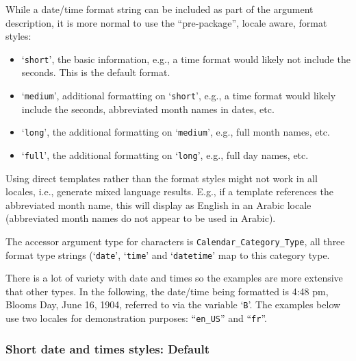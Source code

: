 While a date/time format string can be included as part of the argument
description, it is more normal to use the ``pre-package'', locale aware,
format styles:
\begin{itemize}
\item `\texttt{short}', the basic information, e.g., a time format would
    likely not include the seconds.  This is the default format.
\item `\texttt{medium}', additional formatting on `\texttt{short}', e.g.,
    a time format would likely include the seconds, abbreviated month names
    in dates, etc.
\item `\texttt{long}', the additional formatting on `\texttt{medium}', e.g.,
    full month names, etc.
\item `\texttt{full}', the additional formatting on `\texttt{long}', e.g.,
    full day names, etc.
\end{itemize}
Using direct templates rather than the format styles might not work in all
locales, i.e., generate mixed language results.  E.g., if a template references
the abbreviated month name, this will display as English in an Arabic locale
(abbreviated month names do not appear to be used in Arabic).

The accessor argument type for characters is \texttt{Calendar\_Category\_Type},
all three format type strings (`\texttt{date}', `\texttt{time}' and
`\texttt{datetime}' map to this category type.

There is a lot of variety with date and times so the examples are more
extensive that other types.  In the following, the date/time being formatted
is 4:48 pm, Blooms Day, June 16, 1904, referred to via the variable
`\texttt{B}'.  The examples below use two locales for demonstration purposes:
``\texttt{en\_US}'' and ``\texttt{fr}''.

\subsubsection{Short date and times styles: Default}


